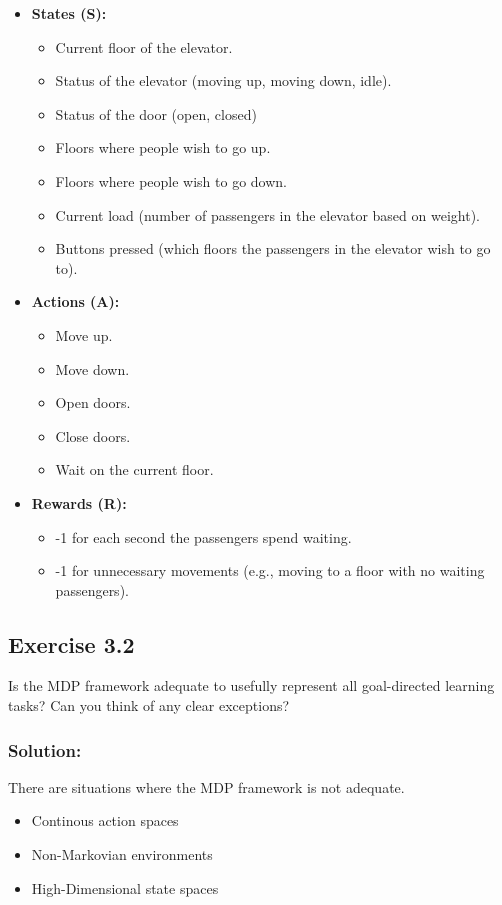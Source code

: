 \begin{itemize}
    \item \textbf{States (S):}
    \begin{itemize}
        \item Current floor of the elevator.
        \item Status of the elevator (moving up, moving down, idle).
        \item Status of the door (open, closed)
        \item Floors where people wish to go up.
        \item Floors where people wish to go down.
        \item Current load (number of passengers in the elevator based on weight).
        \item Buttons pressed (which floors the passengers in the elevator wish to go to).
    \end{itemize}
    
    \item \textbf{Actions (A):}
    \begin{itemize}
        \item Move up.
        \item Move down.
        \item Open doors.
        \item Close doors.
        \item Wait on the current floor.
    \end{itemize}
    
    \item \textbf{Rewards (R):}
    \begin{itemize}
        \item -1 for each second the passengers spend waiting.
        \item -1 for unnecessary movements (e.g., moving to a floor with no waiting passengers).
    \end{itemize}
\end{itemize}


\subsection*{Exercise 3.2}
Is the MDP framework adequate to usefully represent all goal-directed learning tasks? Can you think of any clear exceptions?

\subsubsection*{Solution:}
There are situations where the MDP framework is not adequate. 
\begin{itemize}
    \item Continous action spaces
    \item Non-Markovian environments
    \item High-Dimensional state spaces
\end{itemize}

